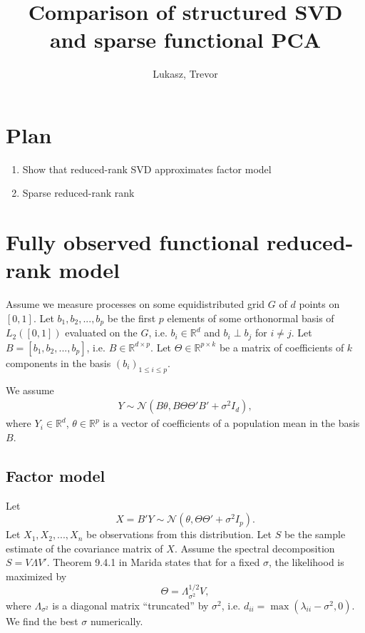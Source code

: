 \documentclass{article}
\title{Comparison of structured SVD\\ and sparse functional PCA}
\author{Lukasz, Trevor}
\newcommand{\cN}{\mathcal{N}}
\newcommand{\R}{\mathbb{R}}
\begin{document}
\maketitle

\section*{Plan}

\begin{enumerate}
  \item Show that reduced-rank SVD approximates factor model
  \item Sparse reduced-rank rank
\end{enumerate}

\section{Fully observed functional reduced-rank model}
Assume we measure processes on some equidistributed grid $G$ of $d$ points on $[0,1]$. Let $b_1, b_2, ..., b_p$ be the first $p$ elements of some orthonormal basis of $L_2([0,1])$ evaluated on the $G$, i.e. $b_i \in \R^d$ and $b_i \perp b_j$ for $i \neq j$. Let $B = [b_1,b_2,...,b_p]$, i.e. $B \in \R^{d \times p}$. Let $\Theta \in \R^{p \times k}$ be a matrix of coefficients of $k$ components in the basis $(b_i)_{1 \leq i \leq p}$.

We assume 
\begin{align}\label{eq:model}
  Y \sim \cN(B\theta, B \Theta \Theta' B' + \sigma^2 I_d),
\end{align}
where $Y_i \in \R^{d}$, $\theta \in \R^{p}$ is a vector of coefficients of a population mean in the basis $B$. %
\subsection{Factor model}
Let
\begin{equation}
X = B'Y \sim \cN(\theta, \Theta \Theta' + \sigma^2 I_p).\label{model:x}
\end{equation}
Let $X_1,X_2,...,X_n$ be observations from this distribution.
Let $S$ be the sample estimate of the covariance matrix of $X$. Assume the spectral decomposition $S = V \Lambda V'$.
Theorem 9.4.1 in Marida states that for a fixed $\sigma$, the likelihood is maximized by
\[
 \Theta = \Lambda_{\sigma^2} ^{1/2}V,
\]
where $\Lambda_{\sigma^2}$ is a diagonal matrix ``truncated'' by $\sigma^2$, i.e. $d_{ii} = \max(\lambda_{ii} - \sigma^2,0)$. We find the best $\sigma$ numerically.
\end{document}
